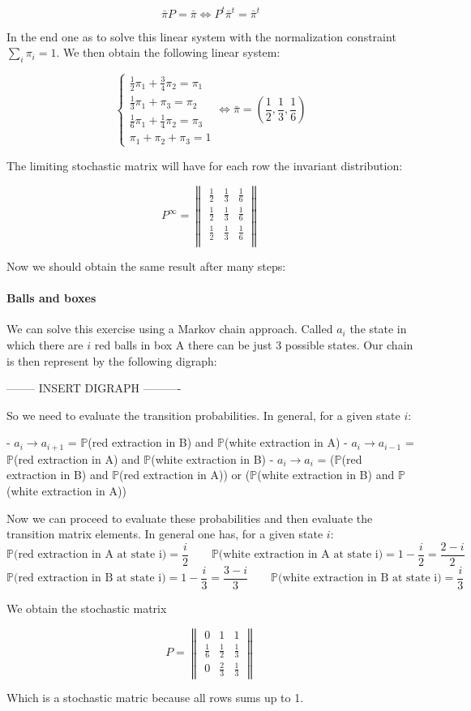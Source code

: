 $$ \bar{\pi}P = \bar{\pi} \iff P^t\bar{\pi}^t = \bar{\pi}^t $$

In the end one as to solve this linear system with the normalization constraint $\sum_i\pi_i=1$.
We then obtain the following linear system:

$$
\begin{cases}
\frac{1}{2}\pi_1 + \frac{3}{4}\pi_2 = \pi_1 \\
\frac{1}{3}\pi_1 + \pi_3 = \pi_2 \\
\frac{1}{6}\pi_1 + \frac{1}{4}\pi_2 = \pi_3 \\
\pi_1 + \pi_2 + \pi_3 = 1
\end{cases} \iff \bar{\pi} = \left( \frac{1}{2}, \frac{1}{3}, \frac{1}{6} \right)
$$

The limiting stochastic matrix will have for each row the invariant distribution:

$$ P^{\infty} =
\begin{Vmatrix} 
\frac{1}{2} & \frac{1}{3} & \frac{1}{6} \\
\frac{1}{2} & \frac{1}{3} & \frac{1}{6} \\
\frac{1}{2} & \frac{1}{3} & \frac{1}{6} \\
\end{Vmatrix}
$$

Now we should obtain the same result after many steps:

\paragraph*{Balls and boxes}



We can solve this exercise using a Markov chain approach.
Called $a_i$ the state in which there are $i$ red balls in box A there can be just 3 possible states.
Our chain is then represent by the following digraph:

-------- INSERT DIGRAPH ----------

So we need to evaluate the transition probabilities. In general, for a given state $i$:

- $a_i \to a_{i+1}$ = $\mathbb{P}$(red extraction in B) and $\mathbb{P}$(white extraction in A)
- $a_i \to a_{i-1}$ = $\mathbb{P}$(red extraction in A) and $\mathbb{P}$(white extraction in B)
- $a_i \to a_{i}$ = ($\mathbb{P}$(red extraction in B) and $\mathbb{P}$(red extraction in A)) or ($\mathbb{P}$(white extraction in B) and $\mathbb{P}$(white extraction in A))

Now we can proceed to evaluate these probabilities and then evaluate the transition matrix elements.
In general one has, for a given state $i$:
$$ \mathbb{P}\text{(red extraction in A at state i)} = \frac{i}{2} \qquad \mathbb{P}\text{(white extraction in A at state i)} = 1- \frac{i}{2} = \frac{2-i}{2} $$
$$ \mathbb{P}\text{(red extraction in B at state i)} = 1 - \frac{i}{3} =  \frac{3-i}{3} \qquad \mathbb{P}\text{(white extraction in B at state i)} = \frac{i}{3} $$

We obtain the stochastic matrix

$$ P =
\begin{Vmatrix} 
0 & 1 & 1 \\
\frac{1}{6} & \frac{1}{2} & \frac{1}{3} \\
0 & \frac{2}{3} & \frac{1}{3}
\end{Vmatrix}
$$

Which is a stochastic matric because all rows sums up to 1.